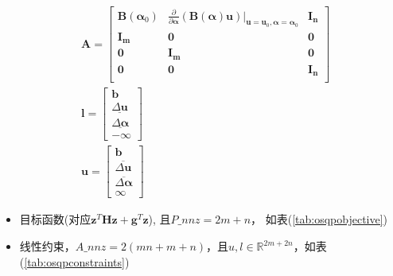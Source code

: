 \begin{equation}
  \label{eq:osqp}
  \begin{aligned}
    & \bm{A}=
    \begin{bmatrix}
      \bm{B}\left(\bm{\alpha}_0 \right)  
      & \frac{\partial}{\partial \bm{\alpha}} \left( \bm{B}(\bm{\alpha})
      \bm{u} \right) |_{\bm{u}=\bm{u}_{0}, \bm{\alpha}=\bm{\alpha}_{0}}
      & \bm{I_n} \\
      \bm{I_m} & \bm{0}   & \bm{0} \\
      \bm{0}   & \bm{I_m} & \bm{0} \\
      \bm{0} & \bm{0} &  \bm{I_n} \\
    \end{bmatrix} \\
    & \bm{l}=
    \begin{bmatrix}
      \bm{b} \\
      \underline{\Delta \bm{u}}  \\
      \underline{\Delta \bm{\alpha}} \\
      -\infty
    \end{bmatrix} \\
    & \bm{u}=
    \begin{bmatrix}
      \bm{b} \\
      \overline{\Delta \bm{u}} \\
      \overline{\Delta \bm{\alpha}} \\
      \infty
    \end{bmatrix} 
  \end{aligned}
\end{equation}


\begin{itemize}

  \item 目标函数(对应$\bm{z}^{T} \bm{H} \bm{z}+\bm{g}^{T} \bm{z}$), 且$P\_nnz=2m+n$，
  如表(\ref{tab:osqpobjective})

  \item 线性约束，$A\_nnz=2(mn+m+n)$，且$u,l \in \mathbb{R}^{2m+2n}$，如表(\ref{tab:osqpconstraints})

\end{itemize}


